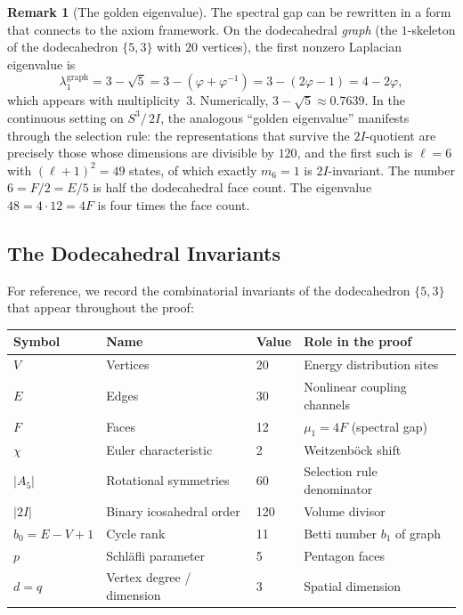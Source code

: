\documentclass[11pt,a4paper]{article}
\theoremstyle{plain}
\theoremstyle{definition}
\newtheorem{remark}[theorem]{Remark}
\newcommand{\phig}{\varphi}              %
\newcommand{\DS}{S^3\!/\,2I}             %
\newcommand{\BI}{2I}                      %
\newcommand{\abs}[1]{\lvert #1 \rvert}
\begin{document}
\begin{remark}[The golden eigenvalue]\label{rem:golden}
The spectral gap can be rewritten in a form that connects to the axiom
framework.  On the dodecahedral \emph{graph} (the $1$-skeleton of the
dodecahedron $\{5,3\}$ with $20$ vertices), the first nonzero Laplacian
eigenvalue is
\begin{equation}\label{eq:graphgap}
  \lambda_1^{\text{graph}} = 3 - \sqrt{5} = 3 - (\phig + \phig^{-1})
  = 3 - (2\phig - 1) = 4 - 2\phig,
\end{equation}
which appears with multiplicity~$3$.  Numerically, $3 - \sqrt{5} \approx
0.7639$.  In the continuous setting on $\DS$, the analogous ``golden
eigenvalue'' manifests through the selection rule: the representations that
survive the $\BI$-quotient are precisely those whose dimensions are divisible
by $120$, and the first such is $\ell = 6$ with $(\ell+1)^2 = 49$ states,
of which exactly $m_6 = 1$ is $\BI$-invariant.  The number $6 = F/2 = E/5$
is half the dodecahedral face count.  The eigenvalue $48 = 4 \cdot 12
= 4F$ is four times the face count.
\end{remark}

\subsection{The Dodecahedral Invariants}

For reference, we record the combinatorial invariants of the dodecahedron
$\{5,3\}$ that appear throughout the proof:

\begin{center}
\renewcommand{\arraystretch}{1.15}
\begin{tabular}{@{}llll@{}}
\toprule
Symbol & Name & Value & Role in the proof \\
\midrule
$V$ & Vertices & 20 & Energy distribution sites \\
$E$ & Edges    & 30 & Nonlinear coupling channels \\
$F$ & Faces    & 12 & $\mu_1 = 4F$ (spectral gap) \\
$\chi$ & Euler characteristic & 2 & Weitzenb\"{o}ck shift \\
$\abs{A_5}$ & Rotational symmetries & 60 & Selection rule denominator \\
$\abs{\BI}$ & Binary icosahedral order & 120 & Volume divisor \\
$b_0 = E - V + 1$ & Cycle rank & 11 & Betti number $b_1$ of graph \\
$p$ & Schl\"{a}fli parameter & 5 & Pentagon faces \\
$d = q$ & Vertex degree / dimension & 3 & Spatial dimension \\
\bottomrule
\end{tabular}
\end{center}
\end{document}
